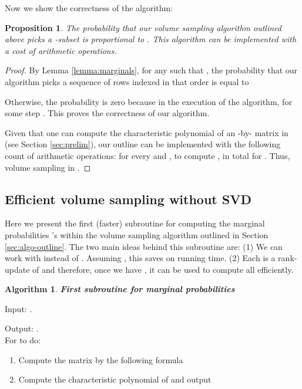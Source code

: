 \documentclass[11pt]{article}
\newtheorem{prop}[theorem]{Proposition}
\newtheorem{alg}{Algorithm}
\begin{document}
Now we show the correctness of the algorithm:
\begin{prop} \label{prop:outline-correct}
The probability that our volume sampling algorithm outlined above picks a -subset  is proportional to . This algorithm can be implemented with a cost of  arithmetic operations.
\end{prop}
\begin{proof}
By Lemma \ref{lemma:marginals}, for any  such that , the probability that our algorithm picks a sequence of rows indexed  in that order is equal to

Otherwise, the probability is zero because in
the execution of the algorithm,
 for some step . This proves the correctness of our algorithm.

Given that one can compute the characteristic polynomial of an -by- matrix in  (see Section \ref{sec:prelim}), our outline can be implemented with the following count of arithmetic operations: for every  and ,  to compute ,  in total for . Thus, volume sampling in .
\end{proof}

\subsection{Efficient volume sampling without SVD} \label{subsec:no-svd}
Here we present the first (faster) subroutine for computing the marginal probabilities 's within the volume sampling algorithm outlined in Section \ref{sec:algo-outline}. The two main ideas behind this subroutine are: (1) We can work with  instead of . Assuming , this saves on running time. (2) Each  is a rank- update of  and therefore, once we have , it can be used to compute all  efficiently.

\begin{framed}
\begin{alg}\label{alg:omegaSub}
{\bf First subroutine for marginal probabilities}
\end{alg}
\noindent Input: .

\noindent Output: . \\

For  to  do:
\begin{enumerate}
\item Compute the matrix  by the following formula

\item Compute the characteristic polynomial of  and output

\end{enumerate}
\end{framed}
\end{document}
